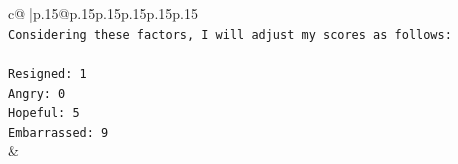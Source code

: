 \documentclass{article}
\begin{document}
{\begin{supertabular}{c@{$\;$}|p{.15\linewidth}@{}p{.15\linewidth}p{.15\linewidth}p{.15\linewidth}p{.15\linewidth}p{.15\linewidth}}
{{{\\ 
\texttt{Considering these factors, I will adjust my scores as follows:} \\
\\ 
\texttt{Resigned: 1} \\
\texttt{Angry: 0} \\
\texttt{Hopeful: 5} \\
\texttt{Embarrassed: 9} \\
            }
        }
    }
    & \\ \\

\end{supertabular}
}
\end{document}
